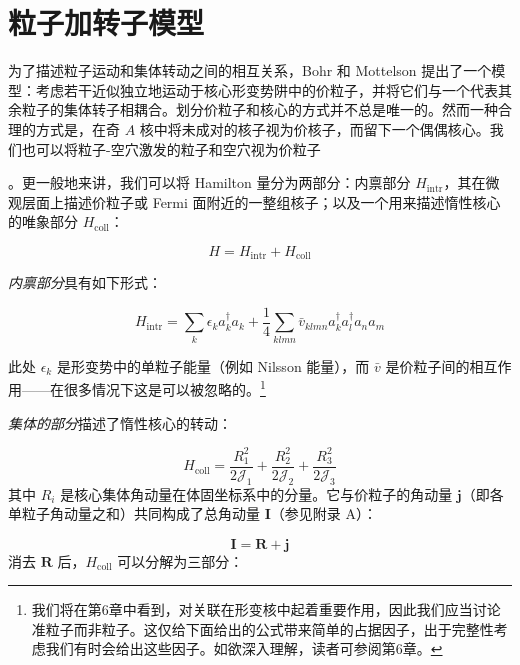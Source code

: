 \section{粒子加转子模型}

为了描述粒子运动和集体转动之间的相互关系，Bohr 和 Mottelson \cite{BM53} 提出了一个模型：考虑若干近似独立地运动于核心形变势阱中的价粒子，并将它们与一个代表其余粒子的集体转子相耦合。划分价粒子和核心的方式并不总是唯一的。然而一种合理的方式是，在奇
$A$ 核中将未成对的核子视为价核子，而留下一个偶偶核心。我们也可以将粒子-空穴激发的粒子和空穴视为价粒子

。更一般地来讲，我们可以将 Hamilton 量分为两部分：内禀部分 $H_{\text{intr}}$，其在微观层面上描述价粒子或
Fermi 面附近的一整组核子；以及一个用来描述惰性核心的唯象部分 $H_{\text{coll}}$：

\begin{equation}
H=H_{\text{intr}}+H_{\text{coll}}\label{eq:3.10}
\end{equation}

\emph{内禀部分}具有如下形式：

\begin{equation}
H_{\text{intr}}=\sum_{k}\epsilon_{k}a^{\dagger}_{k}a_{k}+\frac{1}{4}\sum_{klmn}\bar{v}_{klmn}a^{\dagger}_{k}a^{\dagger}_{l}a_{n}a_{m}\label{eq:3.11}
\end{equation}

此处 $\epsilon_{k}$ 是形变势中的单粒子能量（例如 Nilsson 能量），而 $\bar{v}$ 是价粒子间的相互作用——在很多情况下这是可以被忽略的。\footnote{我们将在第6章中看到，对关联在形变核中起着重要作用，因此我们应当讨论准粒子而非粒子。这仅给下面给出的公式带来简单的占据因子，出于完整性考虑我们有时会给出这些因子。如欲深入理解，读者可参阅第6章。}

\textit{集体的部分}描述了惰性核心的转动：

\begin{equation}
H_{\text{coll}}=\frac{R^{2}_{1}}{2\mathcal{J}_{1}}+\frac{R^{2}_{2}}{2\mathcal{J}_{2}}+\frac{R^{2}_{3}}{2\mathcal{J}_{3}}\label{eq:3.12}
\end{equation}
其中 $R_{i}$ 是核心集体角动量在体固坐标系中的分量。它与价粒子的角动量 $\boldsymbol{j}$（即各单粒子角动量之和）共同构成了总角动量
$\boldsymbol{I}$（参见附录 A）：

\begin{equation}
\boldsymbol{I}=\boldsymbol{R}+\boldsymbol{j}\label{eq:3.13}
\end{equation}
消去 $\boldsymbol{R}$ 后，$H_{\text{coll}}$ 可以分解为三部分：

